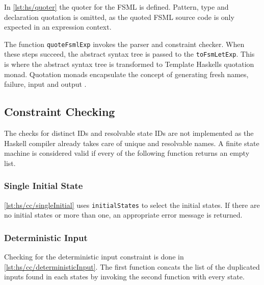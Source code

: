 In \autoref{lst:hs/quoter} the quoter for the FSML is defined.
Pattern, type and declaration quotation is omitted, as the quoted FSML source code is only expected in an expression context.

The function \lstinline[language=haskell]{quoteFsmlExp} invokes the parser and constraint checker.
When these steps succeed, the abstract syntax tree is passed to the \lstinline[language=haskell]{toFsmLetExp}.
This is where the abstract syntax tree is transformed to Template Haskells quotation monad.
Quotation monads encapsulate the concept of generating fresh names, failure, input and output \cite{sheard2002template}.



\subsection{Constraint Checking}
\label{hs:s/cc}

The checks for distinct IDs and resolvable state IDs are not implemented as the Haskell compiler already takes care of unique and resolvable names.
A finite state machine is considered valid if every of the following function returns an empty list.

\subsubsection{Single Initial State}

\autoref{lst:hs/cc/singleInitial} uses \lstinline[language=haskell]{initialStates} to select the initial states.
If there are no initial states or more than one, an appropriate error message is returned.



\subsubsection{Deterministic Input}

Checking for the deterministic input constraint is done in \autoref{lst:hs/cc/deterministicInput}.
The first function concats the list of the duplicated inputs found in each states by invoking the second function with every state.

